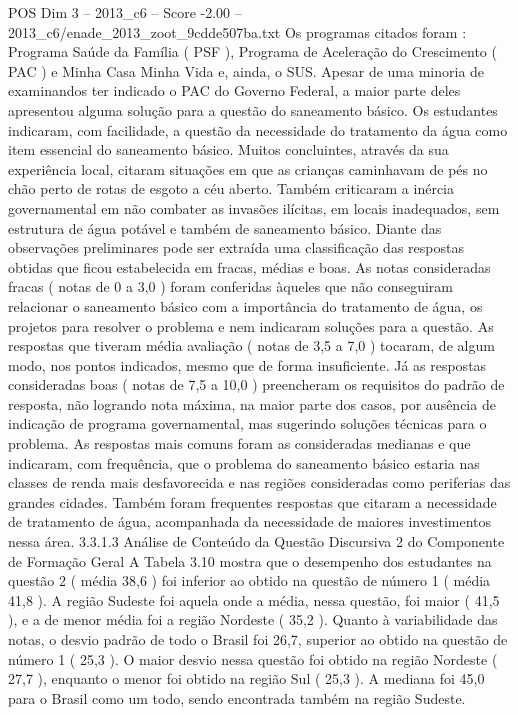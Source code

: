 \begin{textsample}{POS Dim 3 – 2013\_c6 – Score -2.00 – 2013\_c6/enade\_2013\_zoot\_9cdde507ba.txt}
Os programas citados foram : Programa Saúde da Família ( PSF ), Programa de Aceleração do Crescimento ( PAC ) e Minha Casa Minha Vida e, ainda, o SUS.
Apesar de uma minoria de examinandos ter indicado o PAC do Governo Federal, a maior parte deles apresentou alguma solução para a questão do saneamento básico.
Os estudantes indicaram, com facilidade, a questão da necessidade do tratamento da água como item essencial do saneamento básico.
Muitos concluintes, através da sua experiência local, citaram situações em que as crianças caminhavam de pés no chão perto de rotas de esgoto a céu aberto.
Também criticaram a inércia governamental em não combater as invasões ilícitas, em locais inadequados, sem estrutura de água potável e também de saneamento básico.
Diante das observações preliminares pode ser extraída uma classificação das respostas obtidas que ficou estabelecida em fracas, médias e boas.
As notas consideradas fracas ( notas de 0 a 3,0 ) foram conferidas àqueles que não conseguiram relacionar o saneamento básico com a importância do tratamento de água, os projetos para resolver o problema e nem indicaram soluções para a questão.
As respostas que tiveram média avaliação ( notas de 3,5 a 7,0 ) tocaram, de algum modo, nos pontos indicados, mesmo que de forma insuficiente.
Já as respostas consideradas boas ( notas de 7,5 a 10,0 ) preencheram os requisitos do padrão de resposta, não logrando nota máxima, na maior parte dos casos, por ausência de indicação de programa governamental, mas sugerindo soluções técnicas para o problema.
As respostas mais comuns foram as consideradas medianas e que indicaram, com frequência, que o problema do saneamento básico estaria nas classes de renda mais desfavorecida e nas regiões consideradas como periferias das grandes cidades.
Também foram frequentes respostas que citaram a necessidade de tratamento de água, acompanhada da necessidade de maiores investimentos nessa área. 3.3.1.3 Análise de Conteúdo da Questão Discursiva 2 do Componente de Formação Geral A Tabela 3.10 mostra que o desempenho dos estudantes na questão 2 ( média 38,6 ) foi inferior ao obtido na questão de número 1 ( média 41,8 ).
A região Sudeste foi aquela onde a média, nessa questão, foi maior ( 41,5 ), e a de menor média foi a região Nordeste ( 35,2 ).
Quanto à variabilidade das notas, o desvio padrão de todo o Brasil foi 26,7, superior ao obtido na questão de número 1 ( 25,3 ).
O maior desvio nessa questão foi obtido na região Nordeste ( 27,7 ), enquanto o menor foi obtido na região Sul ( 25,3 ).
A mediana foi 45,0 para o Brasil como um todo, sendo encontrada também na região Sudeste.

\end{textsample}
